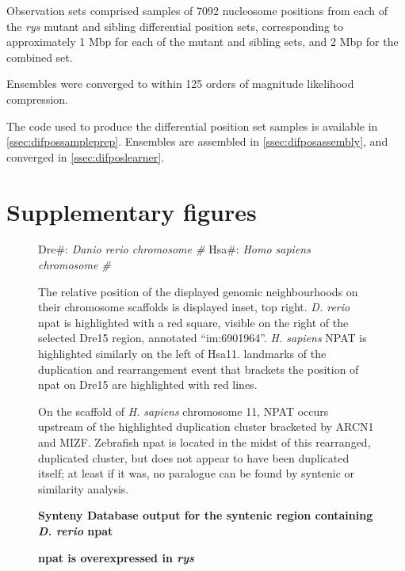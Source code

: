 Observation sets comprised samples of 7092 nucleosome positions from each of the \textit{rys} mutant and sibling differential position sets, corresponding to approximately 1 Mbp for each of the mutant and sibling sets, and 2 Mbp for the combined set.

Ensembles were converged to within 125 orders of magnitude likelihood compression. 

The code used to produce the differential position set samples is available in \autoref{ssec:difpossampleprep}. Ensembles are assembled in \autoref{ssec:difposassembly}, and converged in \autoref{ssec:difposlearner}.

\section{Supplementary figures}

\begin{sidewaysfigure}[!h]
    \caption{{\bf Synteny Database output for the syntenic region containing \textit{D. rerio} npat}}
    Dre\#: \textit{Danio rerio chromosome \#}
    Hsa\#: \textit{Homo sapiens chromosome \#}

    The relative position of the displayed genomic neighbourhoods on their chromosome scaffolds is displayed inset, top right. \textit{D. rerio} npat is highlighted with a red square, visible on the right of the selected Dre15 region, annotated ``im:6901964''. \textit{H. sapiens} NPAT is highlighted similarly on the left of Hsa11. landmarks of the duplication and rearrangement event that brackets the position of npat on Dre15 are highlighted with red lines.

    On the scaffold of \textit{H. sapiens} chromosome 11, NPAT occurs upstream of the highlighted duplication cluster bracketed by ARCN1 and MIZF. Zebrafish npat is located in the midst of this rearranged, duplicated cluster, but does not appear to have been duplicated itself; at least if it was, no paralogue can be found by syntenic or similarity analysis.
    \label{synteny}
\end{sidewaysfigure}

\begin{figure}[!h]
    \caption{{\bf npat is overexpressed in \textit{rys}}} 
    \label{npatrtpcr}
\end{figure}

